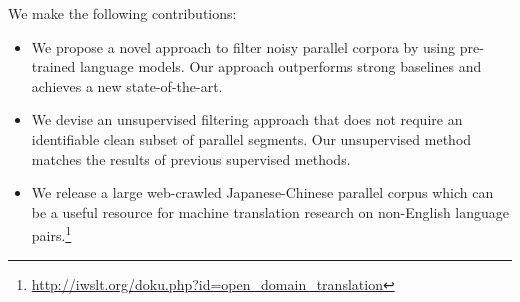 \documentclass[11pt,a4paper]{article}
\begin{document}
We make the following contributions:
\begin{itemize}
\item We propose a novel approach to filter noisy parallel corpora by using pre-trained language models. Our approach outperforms strong baselines and achieves a new state-of-the-art.
	\item We devise an unsupervised filtering approach that does not require an identifiable clean subset of parallel segments.  Our unsupervised method matches the results of previous supervised methods.
\item We release a large web-crawled Japanese-Chinese parallel corpus which can be a useful resource for machine translation research on non-English language pairs.\footnote{\url{http://iwslt.org/doku.php?id=open_domain_translation}}
\end{itemize}
\end{document}
